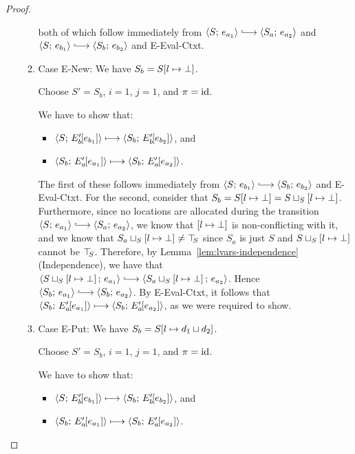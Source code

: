 \begin{proof}
\begin{enumerate}
\begin{enumerate}
      both of which follow immediately from $\config{S}{e_{a_1}}
      \parstepsto \config{S_a}{e_{a_2}}$ and $\config{S}{e_{b_1}}
      \parstepsto \config{S_b}{e_{b_2}}$ and {\sc E-Eval-Ctxt}.

    \item \label{lvars-slc-beta-new}Case {\sc E-New}: We have $S_b =
      S[l \mapsto \bot]$.

      Choose $S' = S_b$, $i = 1$, $j = 1$, and $\pi = \mathrm{id}$.

      We have to show that:
      \begin{itemize}
      \item $\langle S;\, E'_b\hspace{-1mm}\left[e_{b_1}\right] \rangle \longmapsto
        \langle S_b;\, E'_b\hspace{-1mm}\left[e_{b_2}\right] \rangle$, and
      \item
        $\langle S_b;\, E'_a\hspace{-1mm}\left[e_{a_1}\right] \rangle \longmapsto
        \langle S_b;\, E'_a\hspace{-1mm}\left[e_{a_2}\right] \rangle$.
      \end{itemize}

      The first of these follows immediately from $\config{S}{e_{b_1}}
      \parstepsto \config{S_b}{e_{b_2}}$ and {\sc E-Eval-Ctxt}.  For
      the second, consider that $S_b = S[l \mapsto \bot] =
      S \sqcup_{S} \left[ l \mapsto \bot \right]$.  Furthermore,
      since no locations are allocated during the transition
      $\config{S}{e_{a_1}} \parstepsto \config{S_a}{e_{a_2}}$, we know
      that $\left[ l \mapsto \bot \right]$ is non-conflicting with
      it, and we know that
      $S_a \sqcup_{S} \left[ l \mapsto \bot \right] \neq \top\hspace{-0.85mm}_{S}$
      since $S_a$ is just $S$ and
      $S \sqcup_{S} \left[ l \mapsto \bot \right]$ cannot be
      $\top\hspace{-0.85mm}_{S}$.  Therefore, by Lemma~\ref{lem:lvars-independence}
      (Independence), we have that
      $\config{\lubstore{S}{\store{\storebindingRaw{l}{\bot}}}}{e_{a_1}}
      \parstepsto
      \config{\lubstore{S_a}{\store{\storebindingRaw{l}{\bot}}}}{e_{a_2}}$.
      Hence $\config{S_b}{e_{a_1}} \parstepsto \config{S_b}{e_{a_2}}$.
      By {\sc E-Eval-Ctxt}, it follows that
      $\langle S_b;\, E'_a\hspace{-1mm}\left[e_{a_1}\right] \rangle \longmapsto
      \langle S_b;\, E'_a\hspace{-1mm}\left[e_{a_2}\right] \rangle$, as we were required to
      show.

    \item \label{lvars-slc-beta-put}Case {\sc E-Put}: We have $S_b =
      S[l \mapsto d_1 \sqcup d_2]$.

      Choose $S' = S_b$, $i = 1$, $j = 1$, and $\pi = \mathrm{id}$.

      We have to show that:
      \begin{itemize}
      \item $\langle S;\, E'_b\hspace{-1mm}\left[e_{b_1}\right] \rangle \longmapsto
        \langle S_b;\, E'_b\hspace{-1mm}\left[e_{b_2}\right] \rangle$, and
      \item
        $\langle S_b;\, E'_a\hspace{-1mm}\left[e_{a_1}\right] \rangle \longmapsto
        \langle S_b;\, E'_a\hspace{-1mm}\left[e_{a_2}\right] \rangle$.
      \end{itemize}


\end{enumerate}
\end{enumerate}
\end{proof}
